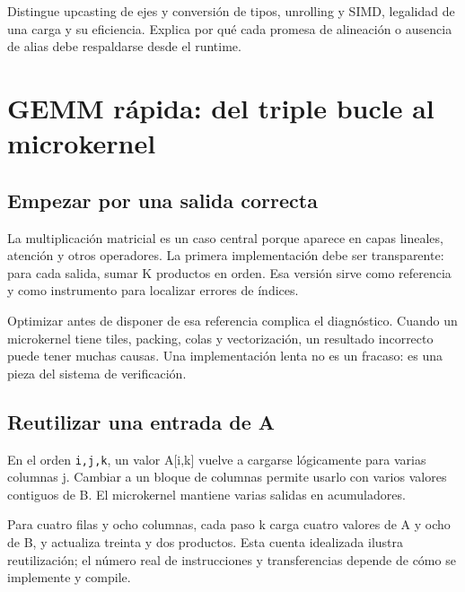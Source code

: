 \documentclass[12pt,a4paper,oneside]{report}
\begin{document}
\begin{comprueba}
Distingue upcasting de ejes y conversión de tipos, unrolling y SIMD, legalidad de una carga y su eficiencia. Explica por qué cada promesa de alineación o ausencia de alias debe respaldarse desde el runtime.

\end{comprueba}
\chapter{GEMM rápida: del triple bucle al microkernel}
\label{ch:gemm}
\section{Empezar por una salida correcta}
La multiplicación matricial es un caso central porque aparece en capas lineales, atención y otros operadores. La primera implementación debe ser transparente: para cada salida, sumar K productos en orden. Esa versión sirve como referencia y como instrumento para localizar errores de índices.

Optimizar antes de disponer de esa referencia complica el diagnóstico. Cuando un microkernel tiene tiles, packing, colas y vectorización, un resultado incorrecto puede tener muchas causas. Una implementación lenta no es un fracaso: es una pieza del sistema de verificación.

\section{Reutilizar una entrada de A}
En el orden \texttt{i,j,k}, un valor A[i,k] vuelve a cargarse lógicamente para varias columnas j. Cambiar a un bloque de columnas permite usarlo con varios valores contiguos de B. El microkernel mantiene varias salidas en acumuladores.

Para cuatro filas y ocho columnas, cada paso k carga cuatro valores de A y ocho de B, y actualiza treinta y dos productos. Esta cuenta idealizada ilustra reutilización; el número real de instrucciones y transferencias depende de cómo se implemente y compile.

\begin{center}
\end{center}
\end{document}
